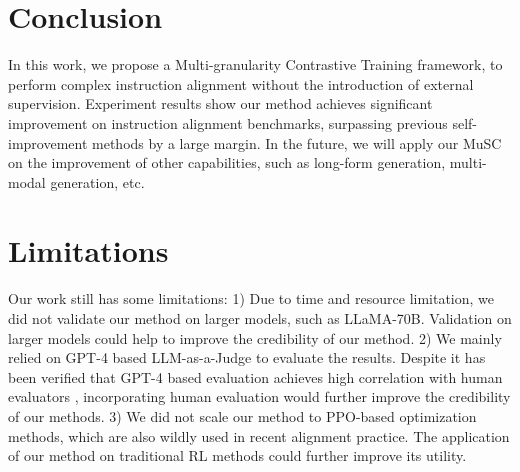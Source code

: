 \section{Conclusion}

In this work, we propose a Multi-granularity Contrastive Training framework, to perform complex instruction alignment without the introduction of external supervision. Experiment results show our method achieves significant improvement on instruction alignment benchmarks, surpassing previous self-improvement methods by a large margin.
In the future, we will apply our MuSC on the improvement of other capabilities, such as long-form generation, multi-modal generation, etc.

\section*{Limitations}

Our work still has some limitations: 1) Due to time and resource limitation, we did not validate our method on larger models, such as LLaMA-70B. Validation on larger models could help to improve the credibility of our method. 2) We mainly relied on GPT-4 based LLM-as-a-Judge to evaluate the results. Despite it has been verified that GPT-4 based evaluation achieves high correlation with human evaluators \cite{zheng2023judging}, incorporating human evaluation would further improve the credibility of our methods. 3) We did not scale our method to PPO-based optimization methods, which are also wildly used in recent alignment practice. The application of our method on traditional RL methods could further improve its utility.